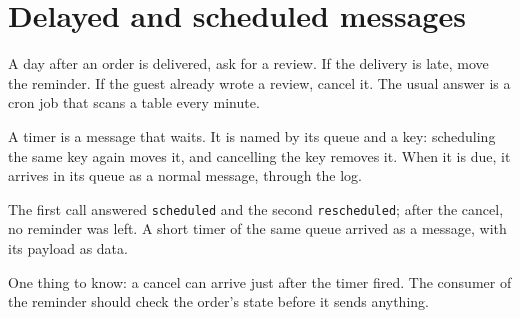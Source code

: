 %

\section{Delayed and scheduled messages}

A day after an order is delivered, ask for a review. If the delivery is late, move the reminder. If
the guest already wrote a review, cancel it. The usual answer is a cron job that scans a table
every minute.

A timer is a message that waits. It is named by its queue and a key: scheduling the same key again
moves it, and cancelling the key removes it. When it is due, it arrives in its queue as a normal
message, through the log.



The first call answered \texttt{scheduled} and the second \texttt{rescheduled}; after the cancel, no
reminder was left. A short timer of the same queue arrived as a message, with its payload as data.


One thing to know: a cancel can arrive just after the timer fired. The consumer of the reminder
should check the order's state before it sends anything.
